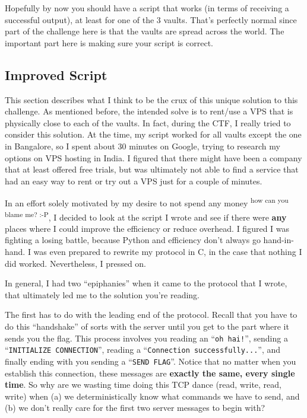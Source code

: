 \documentclass[11pt]{article}
\newcommand{\ts}{\textsuperscript}
\begin{document}
    Hopefully by now you should have a script that works (in terms of receiving a successful output), at least for one of the 3 vaults. That's perfectly normal since part of the challenge here is that the vaults are spread across the world. The important part here is making sure your script is correct.

    \subsection{Improved Script}\label{subsec:improved-script}

    This section describes what I think to be the crux of this unique solution to this challenge. As mentioned before, the intended solve is to rent/use a VPS that is physically close to each of the vaults. In fact, during the CTF, I really tried to consider this solution. At the time, my script worked for all vaults except the one in Bangalore, so I spent about 30 minutes on Google, trying to research my options on VPS hosting in India. I figured that there might have been a company that at least offered free trials, but was ultimately not able to find a service that had an easy way to rent or try out a VPS just for a couple of minutes.

    \bigskip

    In an effort solely motivated by my desire to not spend any money \ts{how can you blame me? :-P}, I decided to look at the script I wrote and see if there were \textbf{any} places where I could improve the efficiency or reduce overhead. I figured I was fighting a losing battle, because Python and efficiency don't always go hand-in-hand. I was even prepared to rewrite my protocol in C, in the case that nothing I did worked. Nevertheless, I pressed on.

    \bigskip

    In general, I had two ``epiphanies'' when it came to the protocol that I wrote, that ultimately led me to the solution you're reading.

    The first has to do with the leading end of the protocol. Recall that you have to do this ``handshake'' of sorts with the server until you get to the part where it sends you the flag. This process involves you reading an ``\verb`oh hai!`'', sending a ``\verb`INITIALIZE CONNECTION`'', reading a ``\verb`Connection successfully...`'', and finally ending with you sending a ``\verb`SEND FLAG`''. Notice that no matter when you establish this connection, these messages are \textbf{exactly the same, every single time}. So why are we wasting time doing this TCP dance (read, write, read, write) when (a) we deterministically know what commands we have to send, and (b) we don't really care for the first two server messages to begin with?
\end{document}
